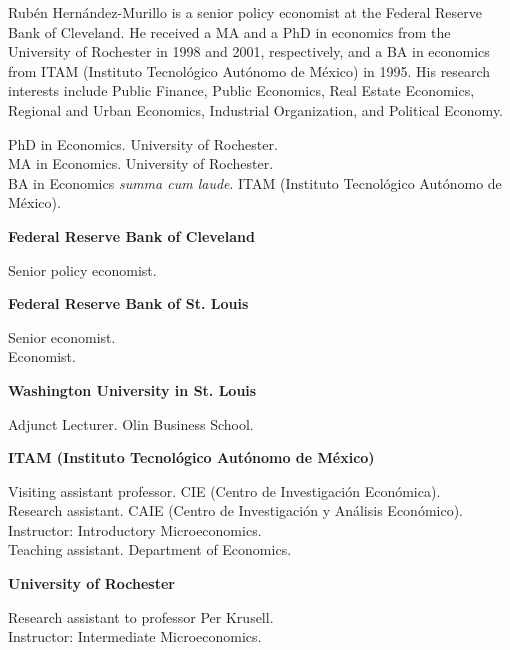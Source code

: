 \documentclass{xetexCV}
\begin{document}
\makecvtitle




Rub\'{e}n Hern\'{a}ndez-Murillo is a senior policy economist at the Federal Reserve Bank of Cleveland. He received a MA and a PhD in economics from the University of Rochester in 1998 and 2001, respectively, and a BA in economics from ITAM (Instituto Tecnol\'{o}gico Aut\'{o}nomo de M\'{e}xico) in 1995. His research interests include Public Finance, Public Economics, Real Estate Economics, Regional and Urban Economics, Industrial Organization,  and Political Economy.

PhD in Economics. University of Rochester.  \\
MA in Economics. University of Rochester.  \\
BA in Economics \emph{summa cum laude}. ITAM (Instituto Tecnol\'{o}gico Aut\'{o}nomo de M\'{e}xico).  \\


\begin{flushleft}
\textbf{Federal Reserve Bank of Cleveland}
\end{flushleft} 
Senior policy economist.   \\
\begin{flushleft}
\textbf{Federal Reserve Bank of St. Louis}
\end{flushleft} 
Senior economist.   \\
Economist.   \\
\begin{flushleft}
\textbf{Washington University in St. Louis}
\end{flushleft} 
Adjunct Lecturer. Olin Business School.  \\
\begin{flushleft}
\textbf{ITAM (Instituto Tecnol\'{o}gico Aut\'{o}nomo de M\'{e}xico)} 
\end{flushleft} 
Visiting assistant professor. CIE (Centro de Investigaci\'{o}n Econ\'{o}mica).   \\
Research assistant. CAIE (Centro de Investigaci\'{o}n y An\'{a}lisis Econ\'{o}mico).   \\
Instructor: Introductory Microeconomics.  \\
Teaching assistant. Department of Economics.  
\begin{flushleft} 
\textbf{University of Rochester} 
\end{flushleft} 
Research assistant to professor Per Krusell.  \\
Instructor: Intermediate Microeconomics.  
\end{document}
